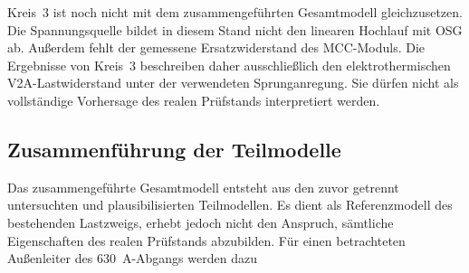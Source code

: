 


Kreis~3 ist noch nicht mit dem zusammengeführten Gesamtmodell
gleichzusetzen. Die Spannungsquelle bildet in diesem Stand nicht den linearen
Hochlauf mit OSG ab. Außerdem fehlt der gemessene Ersatzwiderstand des
MCC-Moduls. Die Ergebnisse von Kreis~3 beschreiben daher ausschließlich den
elektrothermischen V2A-Lastwiderstand unter der verwendeten Sprunganregung.
Sie dürfen nicht als vollständige Vorhersage des realen Prüfstands
interpretiert werden.



\subsection{Zusammenführung der Teilmodelle}
\label{sec:zusammenfuehrung_gesamtmodell}

Das zusammengeführte Gesamtmodell entsteht aus den zuvor getrennt
untersuchten und plausibilisierten Teilmodellen. Es dient als Referenzmodell
des bestehenden Lastzweigs, erhebt jedoch nicht den Anspruch, sämtliche
Eigenschaften des realen Prüfstands abzubilden. Für einen betrachteten
Außenleiter des \SI{630}{\ampere}-Abgangs werden dazu

